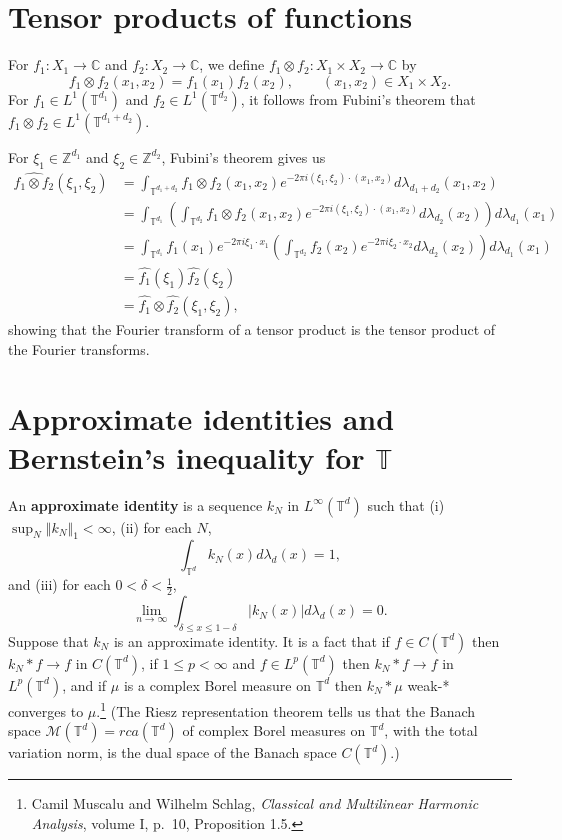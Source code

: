 \documentclass{article}
\newcommand{\norm}[1]{\left\Vert #1 \right\Vert}
\theoremstyle{definition}
\begin{document}
\section{Tensor products of functions}
For $f_1:X_1 \to \mathbb{C}$ and $f_2:X_2 \to \mathbb{C}$, we define
$f_1 \otimes f_2:X_1 \times X_2 \to \mathbb{C}$ by
\[
f_1 \otimes f_2(x_1,x_2) = f_1(x_1)f_2(x_2), \qquad (x_1,x_2) \in X_1 \times X_2.
\]
For $f_1 \in L^1(\mathbb{T}^{d_1})$ and $f_2 \in L^1(\mathbb{T}^{d_2})$, it follows from Fubini's theorem that
$f_1 \otimes f_2 \in L^1(\mathbb{T}^{d_1+d_2})$. 

For $\xi_1 \in \mathbb{Z}^{d_1}$ and $\xi_2 \in \mathbb{Z}^{d_2}$, Fubini's theorem gives us
\begin{align*}
\widehat{f_1 \otimes f_2}(\xi_1,\xi_2)&=\int_{\mathbb{T}^{d_1+d_2}} f_1 \otimes f_2 (x_1,x_2) e^{-2\pi i(\xi_1,\xi_2)\cdot (x_1,x_2)} d\lambda_{d_1+d_2}(x_1,x_2)\\
&=\int_{\mathbb{T}^{d_1}} \left( \int_{\mathbb{T}^{d_2}}  f_1 \otimes f_2 (x_1,x_2) e^{-2\pi i(\xi_1,\xi_2)\cdot (x_1,x_2)} d\lambda_{d_2}(x_2) \right) d\lambda_{d_1}(x_1)\\
&=\int_{\mathbb{T}^{d_1}} f_1(x_1) e^{-2\pi i\xi_1 \cdot x_1} \left( \int_{\mathbb{T}^{d_2}} f_2(x_2) e^{-2\pi i\xi_2 \cdot x_2} d\lambda_{d_2}(x_2) \right)
d\lambda_{d_1}(x_1)\\
&=\hat{f_1}(\xi_1) \hat{f_2}(\xi_2)\\
&=\hat{f_1} \otimes \hat{f_2}(\xi_1,\xi_2),
\end{align*}
showing that the Fourier transform of a tensor product is the tensor product of the Fourier transforms.




\section{Approximate identities and Bernstein's inequality  for $\mathbb{T}$}
An \textbf{approximate identity} is a sequence $k_N$ in $L^\infty(\mathbb{T}^d)$ such that
(i) $\sup_N \norm{k_N}_1 < \infty$,  (ii) for each $N$,
\[
\int_{\mathbb{T}^d} k_N(x) d\lambda_d(x)=1,
\]
and 
(iii) for each $0<\delta<\frac{1}{2}$,
\[
\lim_{n \to \infty} \int_{\delta\leq x \leq 1-\delta} |k_N(x)| d\lambda_d(x)=0.
\]
Suppose that $k_N$ is an approximate identity.
It is a fact that if $f \in C(\mathbb{T}^d)$ then $k_N * f \to f$ in $C(\mathbb{T}^d)$,
if $1 \leq p < \infty$ and $f \in L^p(\mathbb{T}^d)$ then
$k_N*f \to f$ in $L^p(\mathbb{T}^d)$, and if $\mu$ is a complex Borel measure on $\mathbb{T}^d$ then
$k_N * \mu$ weak-* converges to $\mu$.\footnote{Camil Muscalu and Wilhelm Schlag, {\em Classical and Multilinear Harmonic
Analysis}, volume I, p.~10, Proposition 1.5.} (The Riesz representation theorem tells us that the 
Banach space $\mathcal{M}(\mathbb{T}^d)=rca(\mathbb{T}^d)$ of complex Borel measures on $\mathbb{T}^d$, with the total variation norm, is the dual space
of the Banach space $C(\mathbb{T}^d)$.)
\end{document}

